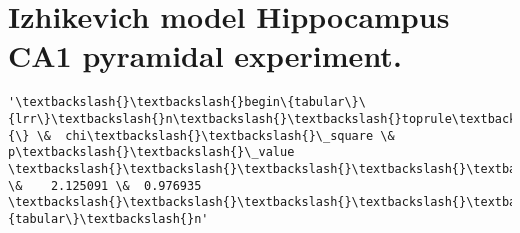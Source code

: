 \documentclass[11pt]{article}
\begin{document}
    \hypertarget{izhikevich-model-hippocampus-ca1-pyramidal-experiment.}{%
\section{Izhikevich model Hippocampus CA1 pyramidal
experiment.}\label{izhikevich-model-hippocampus-ca1-pyramidal-experiment.}}

            \begin{tcolorbox}[breakable, size=fbox, boxrule=.5pt, pad at break*=1mm, opacityfill=0]
\begin{Verbatim}[commandchars=\\\{\}]
'\textbackslash{}\textbackslash{}begin\{tabular\}\{lrr\}\textbackslash{}n\textbackslash{}\textbackslash{}toprule\textbackslash{}n\{\} \&  chi\textbackslash{}\textbackslash{}\_square \&   p\textbackslash{}\textbackslash{}\_value
\textbackslash{}\textbackslash{}\textbackslash{}\textbackslash{}\textbackslash{}n\textbackslash{}\textbackslash{}midrule\textbackslash{}n0 \&    2.125091 \&  0.976935
\textbackslash{}\textbackslash{}\textbackslash{}\textbackslash{}\textbackslash{}n\textbackslash{}\textbackslash{}bottomrule\textbackslash{}n\textbackslash{}\textbackslash{}end\{tabular\}\textbackslash{}n'
\end{Verbatim}
\end{tcolorbox}
        
\end{document}
